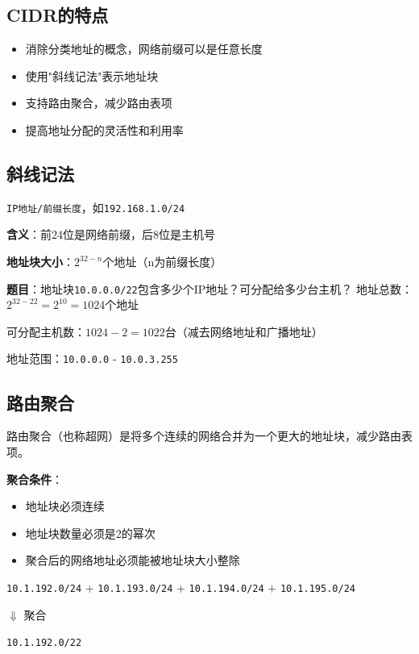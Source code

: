 \documentclass[12pt,a4paper,openany]{ctexbook}
\begin{document}
\subsection{CIDR的特点}
\begin{itemize}[leftmargin=2em,itemsep=0pt]
    \item 消除分类地址的概念，网络前缀可以是任意长度
    \item 使用"斜线记法"表示地址块
    \item 支持路由聚合，减少路由表项
    \item 提高地址分配的灵活性和利用率
\end{itemize}

\subsection{斜线记法}
\texttt{IP地址/前缀长度}，如\texttt{192.168.1.0/24}

\textbf{含义}：前24位是网络前缀，后8位是主机号

\textbf{地址块大小}：$2^{32-n}$个地址（n为前缀长度）

\begin{examplebox}[例题4.2a CIDR地址块]
\textbf{题目}：地址块\texttt{10.0.0.0/22}包含多少个IP地址？可分配给多少台主机？
\tcblower
地址总数：$2^{32-22} = 2^{10} = 1024$个地址

可分配主机数：$1024 - 2 = 1022$台（减去网络地址和广播地址）

地址范围：\texttt{10.0.0.0} - \texttt{10.0.3.255}
\end{examplebox}

\subsection{路由聚合}
路由聚合（也称超网）是将多个连续的网络合并为一个更大的地址块，减少路由表项。

\textbf{聚合条件}：
\begin{itemize}[leftmargin=2em,itemsep=0pt]
    \item 地址块必须连续
    \item 地址块数量必须是2的幂次
    \item 聚合后的网络地址必须能被地址块大小整除
\end{itemize}

\begin{center}
\texttt{10.1.192.0/24} + \texttt{10.1.193.0/24} + \texttt{10.1.194.0/24} + \texttt{10.1.195.0/24}

$\Downarrow$ 聚合

\texttt{10.1.192.0/22}
\end{center}
\end{document}

